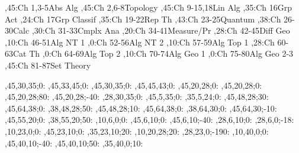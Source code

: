 
\bgroup
\renewcommand{\href}[1]{} %
\renewcommand{\solidwidth}{0.7pt}
\renewcommand{\boldwidth}{1.5pt}

\setcounter{diagheight}{50}
\begin{chart}
,45:{Ch 1,3-5}{Abs Alg}{}
,45:{Ch 2,6-8}{Topology}{}
,45:{Ch 9-15,18}{Lin Alg}{}
,35:{Ch 16}{Grp Act}{}
,24:{Ch 17}{Grp Classif}{}
,35:{Ch 19-22}{Rep Th}{}
,43:{Ch 23-25}{Quantum}{}
,38:{Ch 26-30}{Calc}{}
,30:{Ch 31-33}{Cmplx Ana}{}
,20:{Ch 34-41}{Measure/Pr}{}
,28:{Ch 42-45}{Diff Geo}{}
,10:{Ch 46-51}{Alg NT 1}{}
,0:{Ch 52-56}{Alg NT 2}{}
,10:{Ch 57-59}{Alg Top 1}{}
,28:{Ch 60-63}{Cat Th}{}
,0:{Ch 64-69}{Alg Top 2}{}
,10:{Ch 70-74}{Alg Geo 1}{}
,0:{Ch 75-80}{Alg Geo 2-3}{}
,45:{Ch 81-87}{Set Theory}{}

,45,30,35;0:    %
,45,33,45;0:    %
,45,30,35;0:    %
,45,45,43;0:    %
,45,20,28;0:    %
,45,20,28;0:    %
,45,20,28;80:   %
,45,20,28;-40:  %
,28,30,35;0:    %
,45,5,35;0:     %
,35,5,24;0:     %
,45,48,28;30:   %
,45,64,38;0:    %
,38,48,28;50:   %
,45,48,28;10:   %
,45,64,38;0:    %
,38,64,30;0:    %
,45,64,30;-10:  %
,45,55,20;0:    %
,38,55,20;50:   %
,10,6,0;0:       %
,45,6,10;0:     %
,45,6,10;-40:   %
,28,6,10;0:     %
,28,6,0;-18:    %
,10,23,0;0:     %
,45,23,10;0:    %
,35,23,10;20:   %
,10,20,28;20:    %
,28,23,0;-190:  %
,10,40,0;0:     %
,45,40,10;-40:  %
,45,40,10;50:   %
,35,40,0;10:    %
\end{chart}
\egroup
